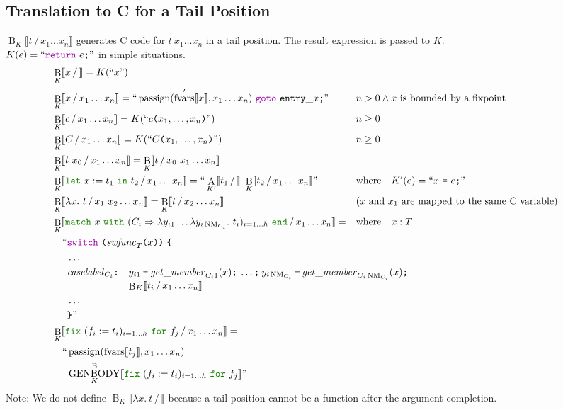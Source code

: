\documentclass[a4paper,fleqn]{article}
\newcommand{\kwlet}{\mbox{\color{mygreen}\ttfamily let}}
\newcommand{\kwin}{\mbox{\color{mygreen}\ttfamily in}}
\newcommand{\kwmatch}{\mbox{\color{mygreen}\ttfamily match}}
\newcommand{\kwwith}{\mbox{\color{mygreen}\ttfamily with}}
\newcommand{\kwend}{\mbox{\color{mygreen}\ttfamily end}}
\newcommand{\kwfix}{\mbox{\color{mygreen}\ttfamily fix}}
\newcommand{\kwfor}{\mbox{\color{mygreen}\ttfamily for}}
\newcommand{\lam}[2]{\lambda #1.~#2}
\newcommand{\lamB}[1]{\lambda #1.~}
\newcommand{\letin}[3]{\kwlet~#1:=#2~\kwin~#3}
\newcommand{\match}[4]{\kwmatch~#1~\kwwith~(#2 \Rightarrow #3)_{#4}~\kwend}
\newcommand{\fix}[4]{\kwfix~(#1 := #2)_{#3}~\kwfor~#4}
\DeclareMathOperator{\NM}{NM}
\newcommand{\BRA}[1]{\llbracket #1 \rrbracket}
\DeclareMathOperator{\genbody}{GENBODY}
\newcommand{\genbodyb}[2]{\genbody^\mathrm{B}_{#1}\BRA{#2}}
\newcommand{\dq}[1]{\text{``}#1\text{''}}
\newcommand{\ttparen}[1]{\texttt{(}#1\texttt{)}}
\newcommand{\ttlbrace}{\texttt{\{}}
\newcommand{\ttrbrace}{\texttt{\}}}
\newcommand{\tteq}{\texttt{=}}
\newcommand{\ttsemi}{\texttt{;}}
\newcommand{\ttcolon}{\texttt{:}}
\newcommand{\kwswitch}{\mbox{\color{myviolet}\ttfamily switch}}
\newcommand{\kwgoto}{\mbox{\color{myviolet}\ttfamily goto}}
\newcommand{\kwCreturn}{\mbox{\color{myviolet}\ttfamily return}}
\DeclareMathOperator{\passign}{passign}
\DeclareMathOperator{\fvarsop}{fvars}
\newcommand{\fvars}[1]{\fvarsop\BRA{#1}}
\newcommand{\fvarsd}[1]{\fvarsop'\BRA{#1}}
\DeclareMathOperator{\Aop}{A}
\DeclareMathOperator{\Bop}{B}
\newcommand{\A}[3]{\Aop_{#1}\BRA{#2\,/\,#3}}
\newcommand{\B}[3]{\Bop_{#1}\BRA{#2\,/\,#3}}
\begin{document}
\subsection{Translation to C for a Tail Position}\label{sec:BK}
\raggedright
$\B{K}{t}{x_1\dots x_n}$ generates C code for $t~x_1\dots x_n$ in a tail position.
The result expression is passed to $K$. \\
$K(e) = \dq{\kwCreturn~e\ttsemi}$ in simple situations.
\begin{align*}
  &\B{K}{x}{} = K(\dq{x}) \\
  &\B{K}{x}{x_1\dots x_n} = \dq{\passign(\fvarsd{x}, x_1\dots x_n)~\kwgoto~\mathtt{entry\_}x\ttsemi}   && n > 0 \wedge \text{$x$ is bounded by a fixpoint} \\
  &\B{K}{c}{x_1\dots x_n} = K(\dq{c\ttparen{x_1,\dots, x_n}})                                   && n \geq 0 \\
  &\B{K}{C}{x_1\dots x_n} = K(\dq{C\ttparen{x_1,\dots, x_n}})                                   && n \geq 0 \\
  &\B{K}{t~x_0}{x_1\dots x_n} = \B{K}{t}{x_0~x_1\dots x_n} \\
  &\B{K}{\letin{x}{t_1}{t_2}}{x_1\dots x_n} = \dq{\A{K'}{t_1}{}~\B{K}{t_2}{x_1\dots x_n}}  && \text{where}\quad K'(e) = \dq{x~\tteq~e\ttsemi} \\
  &\B{K}{\lam{x}{t}}{x_1~x_2\dots x_n} = \B{K}{t}{x_2\dots x_n}                                 && \text{($x$ and $x_1$ are mapped to the same C variable)} \\
  &\B{K}{\match{x}{C_i}{\lambda y_{i1}\dots\lamB{y_{i\NM_{C_i}}}t_i}{i=1\dots h}}{x_1\dots x_n} = && \text{where}\quad x : T \\
     & \quad\begin{alignedat}{2}
       \text{``} & \kwswitch~\ttparen{\mathit{swfunc}_T\ttparen{x}}~\ttlbrace \\
                 & \dots \\
                 & \mathit{caselabel}_{C_i}\ttcolon\quad
                   \begin{minipage}[t]{1cm}
                     $y_{i1}~\tteq~\mathit{get\_member}_{C_i1}(x)\ttsemi ~\dots\ttsemi~ y_{i\NM_{C_i}}~\tteq~\mathit{get\_member}_{C_i\NM_{C_i}}(x)\ttsemi$ \\
                     $\quad \B{K}{t_i}{x_1\dots x_n}$
                   \end{minipage} \\
                 & \dots \\
                 & \ttrbrace\text{''}
     \end{alignedat} \\
  &\B{K}{\fix{f_i}{t_i}{i=1\dots h}{f_j}}{x_1\dots x_n} =       \\
     & \quad\begin{alignedat}{2}
       \text{``} & \passign(\fvars{t_j}, x_1\dots x_n) \\
                 & \genbodyb{K}{\fix{f_i}{t_i}{i=1\dots h}{f_j}} \text{''}
       \end{alignedat}
\end{align*}
{\small Note: \quad We do not define $\B{K}{\lam{x}{t}}{}$ because a tail position cannot be a function after the argument completion.}
\end{document}
